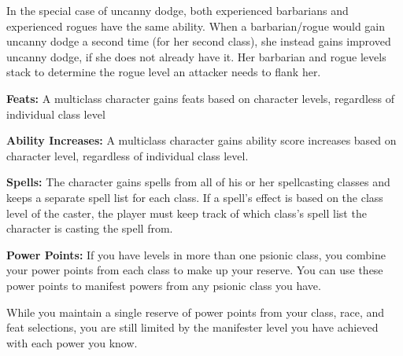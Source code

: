 In the special case of uncanny dodge, both experienced barbarians and experienced rogues have the same ability. When a barbarian/rogue would gain uncanny dodge a second time (for her second class), she instead gains improved uncanny dodge, if she does not already have it. Her barbarian and rogue levels stack to determine the rogue level an attacker needs to flank her.

\textbf{Feats:} A multiclass character gains feats based on character levels, regardless of individual class level

\textbf{Ability Increases:} A multiclass character gains ability score increases based on character level, regardless of individual class level.

\textbf{Spells:} The character gains spells from all of his or her spellcasting classes and keeps a separate spell list for each class. If a spell's effect is based on the class level of the caster, the player must keep track of which class's spell list the character is casting the spell from.

\textbf{Power Points:} If you have levels in more than one psionic class, you combine your power points from each class to make up your reserve. You can use these power points to manifest powers from any psionic class you have.

While you maintain a single reserve of power points from your class, race, and feat selections, you are still limited by the manifester level you have achieved with each power you know.